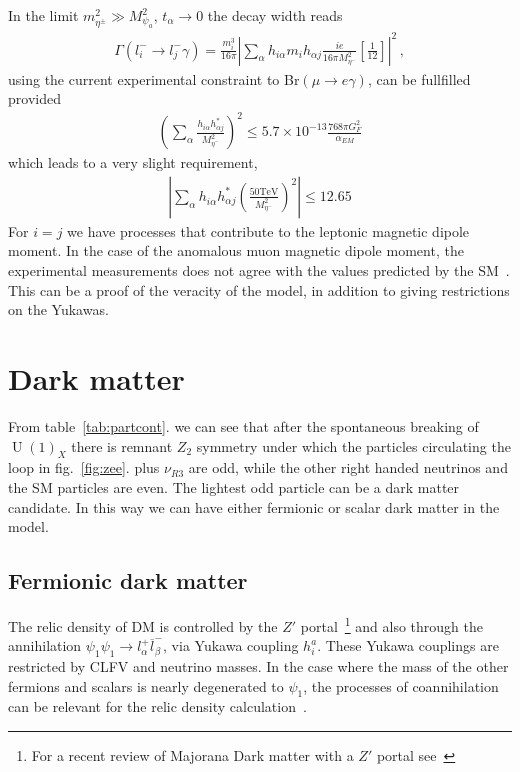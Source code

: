 \documentclass[12pt]{article}
\begin{document}
In the limit $m_{\eta^{\pm}}^{2} \gg M_{\psi_{a}}^{2}$, $t_{\alpha} \to 0$ the decay width reads
%
\begin{align}
 \Gamma(l^{-}_{i} \to l^{-}_{j} \gamma) = \frac{m^{3}_{i}}{16 \pi} \left| \sum_{\alpha} h_{i \alpha} m_{i} h_{\alpha j} \frac{i e}{16 \pi M^{2}_{\eta^{-}}} \left[ \frac{1}{12} \right] \right|^{2}\,, 
\end{align}
%
using the current experimental constraint to Br$(\mu \to e\gamma)$, can be fullfilled provided
%
\begin{align*}
    \left( \sum_{\alpha} \frac{h^{}_{i \alpha} h_{\alpha j}^{*}}{M^{2}_{\eta^{-}}} \right)^{2} \leq 5.7 \times 10^{-13} \frac{768 \pi G_{F}^{2}}{\alpha_{EM}}
\end{align*}
%
which leads to a very slight requirement,
\begin{align*}
    \left| \sum_{\alpha}h^{}_{i \alpha} h_{\alpha j}^{*}\left(\frac{50\text{TeV}}{M^{2}_{\eta^{-}}} \right)^{2} \right| \leq 12.65
\end{align*}
%
For $i = j$ we have processes that contribute to the leptonic magnetic dipole moment. In the case of the anomalous muon magnetic dipole moment, the experimental measurements does not agree with the values predicted by the SM~\cite{Lindner:2016bgg}. This can be a proof of the veracity of the model, in addition to giving restrictions on the Yukawas.

\section{Dark matter}
\label{sec:DM}
From table~\ref{tab:partcont}. we can see that after the spontaneous breaking of
$\operatorname{U}(1)_X$ there is remnant $Z_2$ symmetry under which the particles circulating the loop in fig.~\ref{fig:zee}. plus $\nu_{R3}$ are odd, while the other right handed neutrinos and the SM particles are even. The lightest odd particle can be a dark matter candidate. In this way we can have either fermionic or scalar dark matter in the model.

\subsection{Fermionic dark matter}
The relic density of DM is controlled by the $Z'$ portal~\footnote{For
  a recent review of Majorana Dark matter with a $Z'$ portal
  see~\cite{Blanco:2019hah} } and
also through the annihilation
$\psi_{1} \psi_{1} \to l _{\alpha}^+ \overline{l}_{\beta}^- $, via
Yukawa coupling $h^{a}_{i}$. These Yukawa couplings are restricted by
CLFV and neutrino masses. %
In the case where the mass of the other fermions and scalars is nearly
degenerated to $\psi_{1} $, the processes of coannihilation can be
relevant for the relic density calculation~\cite{Klasen:2013jpa}.
\end{document}
